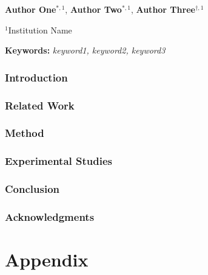 \documentclass[11pt]{article}
\numberwithin{equation}{section}
\begin{document}
\thispagestyle{empty}

\noindent
\begin{tcolorbox}[
    enhanced,
    frame hidden,
    colback=Lavender!50,
    colframe=Lavender!50,
    arc=12pt,
    left=16pt,right=16pt,top=16pt,bottom=16pt,
    width=\textwidth
  ]
  \raggedright

  {\LARGE\sffamily\bfseries\par}

  \vspace{0.8em}

  {\normalsize\sffamily
    \textbf{Author One}$^{*,1}$,
    \textbf{Author Two}$^{*,1}$,
    \textbf{Author Three}$^{\dagger,1}$\\
  \par}

  \vspace{0.35em}

  {\normalsize
  $^{1}$Institution Name\par}

  \vspace{1.0em}

  \textbf{Keywords:} \textit{keyword1, keyword2, keyword3}\par
\end{tcolorbox}

\begingroup
\renewcommand{\thefootnote}{\fnsymbol{footnote}}\setcounter{footnote}{0}
\endgroup

\setcounter{footnote}{0}

\section{Introduction}
\label{sec:intro}


\section{Related Work}
\label{sec:related}


\section{Method}
\label{sec:method}


\section{Experimental Studies}
\label{sec:exp}


\section{Conclusion}
\label{sec:conclusion}


\section*{Acknowledgments}





\clearpage
\appendix
\part*{Appendix}

\end{document}
